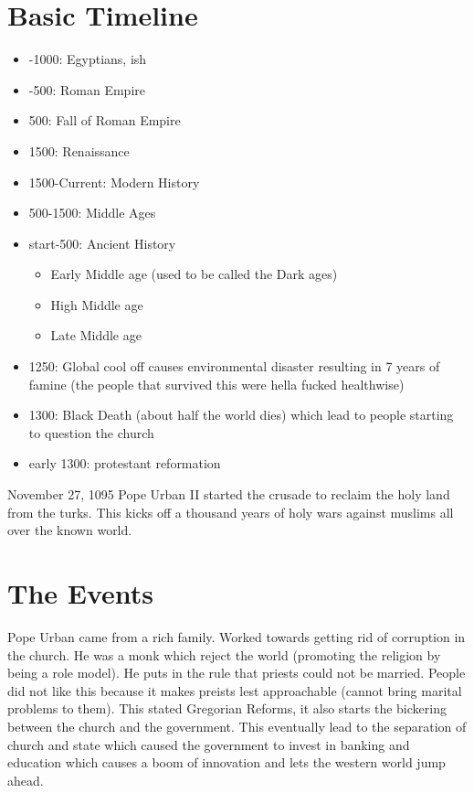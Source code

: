 \documentclass{article}
\begin{document}
\section*{Basic Timeline}
\label{sec:basic_timeline}
\begin{itemize}
	\item -1000: Egyptians, ish
	\item -500: Roman Empire
	\item 500: Fall of Roman Empire
	\item 1500: Renaissance
	\item 1500-Current: Modern History
	\item 500-1500: Middle Ages
	\item start-500: Ancient History
	\begin{itemize}
		\item Early Middle age (used to be called the Dark ages)
		\item High Middle age
		\item Late Middle age
	\end{itemize}
	\item 1250: Global cool off causes environmental disaster resulting in 7 years of famine (the people that survived this were hella fucked healthwise)
	\item 1300: Black Death (about half the world dies) which lead to people starting to question the church
	\item early 1300: protestant reformation
\end{itemize}

November 27, 1095 Pope Urban II started the crusade to reclaim the holy land from the turks. This kicks off a thousand years of holy wars against muslims all over the known world.

\section*{The Events}
\label{sec:the_events}
Pope Urban came from a rich family. Worked towards getting rid of corruption in the church. He was a monk which reject the world (promoting the religion by being a role model). He puts in the rule that priests could not be married. People did not like this because it makes preists lest approachable (cannot bring marital problems to them). This stated Gregorian Reforms, it also starts the bickering between the church and the government. This eventually lead to the separation of church and state which caused the government to invest in banking and education which causes a boom of innovation and lets the western world jump ahead.
\end{document}
